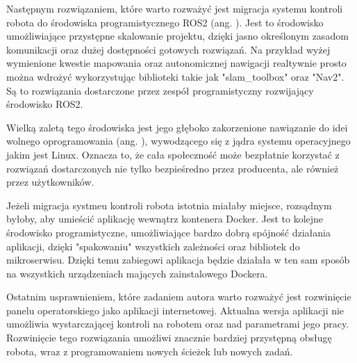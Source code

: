 \vspace*{l}

Następnym rozwiązaniem, które warto rozważyć jest migracja systemu kontroli robota do środowiska programistycznego ROS2 (ang. ). Jest to środowisko umożliwiające przystępne skalowanie projektu, dzięki jasno określonym zasadom komunikacji oraz dużej dostępności gotowych rozwiązań. Na przykład wyżej wymienione kwestie mapowania oraz autonomicznej nawigacji realtywnie prosto można wdrożyć wykorzystując biblioteki takie jak "slam\_toolbox" oraz "Nav2". Są to rozwiązania dostarczone przez zespół programistyczny rozwijający środowisko ROS2. 

Wielką zaletą tego środowiska jest jego głęboko zakorzenione nawiązanie do idei wolnego oprogramowania (ang. ), wywodzącego się z jądra systemu operacyjnego jakim jest Linux. Oznacza to, że cała społeczność może bezpłatnie korzystać z rozwiązań dostarczonych nie tylko bezpieśredno przez producenta, ale również przez użytkowników. 

Jeżeli migracja systmeu kontroli robota istotnia miałaby miejsce, rozsądnym byłoby, aby umieścić aplikację wewnątrz kontenera Docker. Jest to kolejne środowisko programistyczne, umożliwiające bardzo dobrą spójność działania aplikacji, dzięki "spakowaniu" wszystkich zależności oraz bibliotek do mikroserwisu. Dzięki temu zabiegowi aplikacja będzie działała w ten sam sposób na wszystkich urządzeniach mających zainstalowego Dockera. 

\vspace*{l}

Ostatnim usprawnieniem, które zadaniem autora warto rozważyć jest rozwinięcie panelu operatorskiego jako aplikacji internetowej. Aktualna wersja aplikacji nie umożliwia wystarczającej kontroli na robotem oraz nad parametrami jego pracy. Rozwinięcie tego rozwiązania umożliwi znacznie bardziej przystępną obsługę robota, wraz z programowaniem nowych ścieżek lub nowych zadań.
